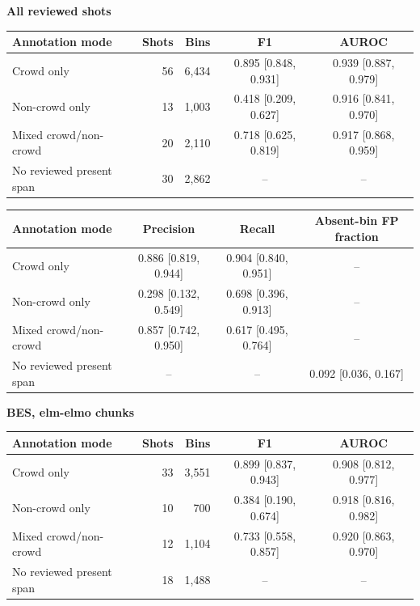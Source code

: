 \begin{table}[t]
\centering
\small
\textbf{All reviewed shots}\par\smallskip
\begin{tabular}{lrrcc}
\toprule
Annotation mode & Shots & Bins & F1 & AUROC \\
\midrule
Crowd only & 56 & 6,434 & 0.895 {\scriptsize[0.848, 0.931]} & 0.939 {\scriptsize[0.887, 0.979]} \\
Non-crowd only & 13 & 1,003 & 0.418 {\scriptsize[0.209, 0.627]} & 0.916 {\scriptsize[0.841, 0.970]} \\
Mixed crowd/non-crowd & 20 & 2,110 & 0.718 {\scriptsize[0.625, 0.819]} & 0.917 {\scriptsize[0.868, 0.959]} \\
No reviewed present span & 30 & 2,862 & -- & -- \\
\bottomrule
\end{tabular}\par\smallskip
\begin{tabular}{lccc}
\toprule
Annotation mode & Precision & Recall & Absent-bin FP fraction \\
\midrule
Crowd only & 0.886 {\scriptsize[0.819, 0.944]} & 0.904 {\scriptsize[0.840, 0.951]} & -- \\
Non-crowd only & 0.298 {\scriptsize[0.132, 0.549]} & 0.698 {\scriptsize[0.396, 0.913]} & -- \\
Mixed crowd/non-crowd & 0.857 {\scriptsize[0.742, 0.950]} & 0.617 {\scriptsize[0.495, 0.764]} & -- \\
No reviewed present span & -- & -- & 0.092 {\scriptsize[0.036, 0.167]} \\
\bottomrule
\end{tabular}\par\medskip
\textbf{BES, elm-elmo chunks}\par\smallskip
\begin{tabular}{lrrcc}
\toprule
Annotation mode & Shots & Bins & F1 & AUROC \\
\midrule
Crowd only & 33 & 3,551 & 0.899 {\scriptsize[0.837, 0.943]} & 0.908 {\scriptsize[0.812, 0.977]} \\
Non-crowd only & 10 & 700 & 0.384 {\scriptsize[0.190, 0.674]} & 0.918 {\scriptsize[0.816, 0.982]} \\
Mixed crowd/non-crowd & 12 & 1,104 & 0.733 {\scriptsize[0.558, 0.857]} & 0.920 {\scriptsize[0.863, 0.970]} \\
No reviewed present span & 18 & 1,488 & -- & -- \\
\bottomrule
\end{tabular}\par\smallskip

\end{table}
